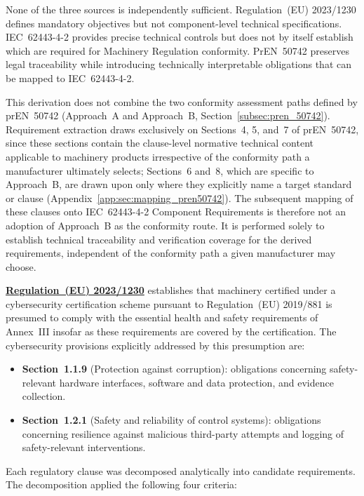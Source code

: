 None of the three sources is independently sufficient. Regulation~(EU) 2023/1230 defines mandatory objectives but not component-level technical specifications. IEC~62443-4-2 provides precise technical controls but does not by itself establish which are required for Machinery Regulation conformity. PrEN~50742 preserves legal traceability while introducing technically interpretable obligations that can be mapped to IEC~62443-4-2.

This derivation does not combine the two conformity assessment paths defined by prEN~50742 (Approach~A and Approach~B, Section~\ref{subsec:pren_50742}). Requirement extraction draws exclusively on Sections~4, 5, and~7 of prEN~50742, since these sections contain the clause-level normative technical content applicable to machinery products irrespective of the conformity path a manufacturer ultimately selects; Sections~6 and~8, which are specific to Approach~B, are drawn upon only where they explicitly name a target standard or clause (Appendix~\ref{app:sec:mapping_pren50742}). The subsequent mapping of these clauses onto IEC~62443-4-2 Component Requirements is therefore not an adoption of Approach~B as the conformity route. It is performed solely to establish technical traceability and verification coverage for the derived requirements, independent of the conformity path a given manufacturer may choose.


\hyperref[subsec:eu_machinery_regulation]{\textbf{Regulation~(EU) 2023/1230}} establishes that machinery certified under a cybersecurity certification scheme pursuant to Regulation~(EU) 2019/881 is presumed to comply with the essential health and safety requirements of Annex~III insofar as these requirements are covered by the certification. The cybersecurity provisions explicitly addressed by this presumption are:

\begin{itemize}
	\item \textbf{Section~1.1.9} (Protection against corruption): obligations concerning safety-relevant hardware interfaces, software and data protection, and evidence collection.
	\item \textbf{Section~1.2.1} (Safety and reliability of control systems): obligations concerning resilience against malicious third-party attempts and logging of safety-relevant interventions.
\end{itemize}



Each regulatory clause was decomposed analytically into candidate requirements. The decomposition applied the following four criteria:

